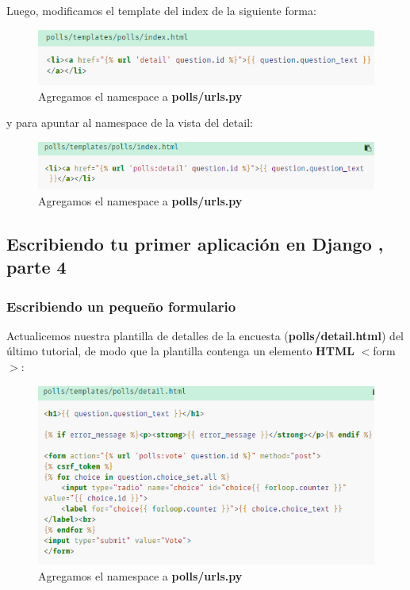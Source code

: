 \documentclass[10pt]{article}
\newcommand{\django}[1]{{\textcolor{G}{Django} #1}}
\begin{document}
Luego, modificamos el template del index de la siguiente forma:

\begin{figure}[H]
\begin{center}
\includegraphics[scale=1]{figuras/3/33/337/img2.png}
\caption{Agregamos el namespace a \textbf{polls/urls.py}}
\end{center}
\end{figure}

y para apuntar al namespace de la vista del detail:

\begin{figure}[H]
\begin{center}
\includegraphics[scale=1]{figuras/3/33/337/img3.png}
\caption{Agregamos el namespace a \textbf{polls/urls.py}}
\end{center}
\end{figure}

\newpage
\subsection{Escribiendo tu primer aplicación en \django{}, parte 4}
\subsubsection{Escribiendo un pequeño formulario}

Actualicemos nuestra plantilla de detalles de la encuesta (\textbf{polls/detail.html}) del último tutorial, de modo que la plantilla contenga un elemento \textbf{HTML} \textcolor{G}{$<$form$>$}:

\begin{figure}[H]
\begin{center}
\includegraphics[scale=1]{figuras/3/34/341/img1.png}
\caption{Agregamos el namespace a \textbf{polls/urls.py}}
\end{center}
\end{figure}
\end{document}
